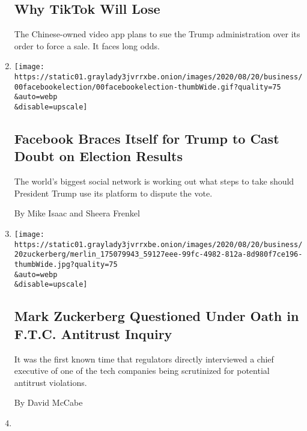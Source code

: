 \begin{enumerate}
  \hypertarget{why-tiktok-will-lose}{%
  \subsection{Why TikTok Will Lose}\label{why-tiktok-will-lose}}

  The Chinese-owned video app plans to sue the Trump administration over
  its order to force a sale. It faces long odds.
\item
  \href{/2020/08/21/technology/facebook-trump-election.html}{}

  \texttt{[image: https://static01.graylady3jvrrxbe.onion/images/2020/08/20/business/00facebookelection/00facebookelection-thumbWide.gif?quality=75\\\&auto=webp\\\&disable=upscale]}

  \hypertarget{facebook-braces-itself-for-trump-to-cast-doubt-on-election-results}{%
  \subsection{Facebook Braces Itself for Trump to Cast Doubt on Election
  Results}\label{facebook-braces-itself-for-trump-to-cast-doubt-on-election-results}}

  The world's biggest social network is working out what steps to take
  should President Trump use its platform to dispute the vote.

  By Mike Isaac and Sheera Frenkel
\item
  \href{/2020/08/20/technology/facebook-zuckerberg-ftc-questioned.html}{}

  \texttt{[image: https://static01.graylady3jvrrxbe.onion/images/2020/08/20/business/20zuckerberg/merlin\_175079943\_59127eee-99fc-4982-812a-8d980f7ce196-thumbWide.jpg?quality=75\\\&auto=webp\\\&disable=upscale]}

  \hypertarget{mark-zuckerberg-questioned-under-oath-in-ftc-antitrust-inquiry}{%
  \subsection{Mark Zuckerberg Questioned Under Oath in F.T.C. Antitrust
  Inquiry}\label{mark-zuckerberg-questioned-under-oath-in-ftc-antitrust-inquiry}}

  It was the first known time that regulators directly interviewed a
  chief executive of one of the tech companies being scrutinized for
  potential antitrust violations.

  By David McCabe
\item
  \href{/2020/08/15/opinion/qanon-marjorie-greene-congress.html}{}


\end{enumerate}
